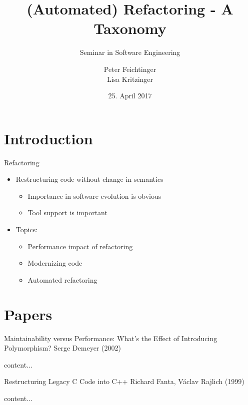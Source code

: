 \documentclass{beamer}
\title[Refactoring]{(Automated) Refactoring - A Taxonomy}
\subtitle{Seminar in Software Engineering}
\institute[]{Institute for Software Systems Engineering\\Johannes Kepler University Linz}
\author[Feichtinger, Kritzinger]{Peter Feichtinger\texorpdfstring{\\}{, }Lisa Kritzinger} %
\date{25. April 2017}
\begin{document}
\begin{frame}
  \titlepage
\end{frame}



\section{Introduction}  %

\begin{frame}{Refactoring}
  \begin{itemize}
    \item Restructuring code without change in semantics
    \begin{itemize}
      \item Importance in software evolution is obvious
      \item Tool support is important
    \end{itemize}
  \end{itemize}
  \pause
  \begin{itemize}
    \item Topics:
    \begin{itemize}
      \item Performance impact of refactoring
      \item Modernizing code
      \item Automated refactoring
    \end{itemize}
  \end{itemize}
\end{frame}

\section{Papers}

\begin{frame}{Maintainability versus Performance: What's the Effect of Introducing Polymorphism?}
  {Serge Demeyer (2002)}
  
  content...
\end{frame}

\begin{frame}{Restructuring Legacy C Code into C++}
  {Richard Fanta, Václav Rajlich (1999)}
  
  content...
\end{frame}
\end{document}
